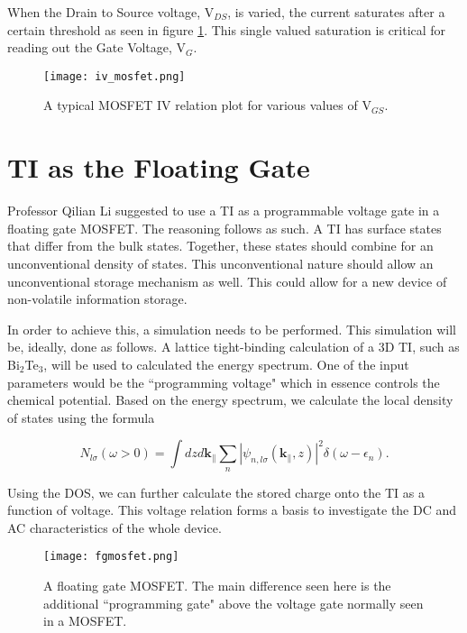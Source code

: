 \documentclass[11pt,revtex,aps]{report}
\begin{document}
When the Drain to Source voltage, V$_{DS}$, is varied, the current saturates after a certain threshold as seen in figure \ref{ivmosfet}. This single valued saturation is critical for reading out the Gate Voltage, V$_G$. 

\begin{figure}[h]
\center
\texttt{[image: iv\_mosfet.png]}
\caption{A typical MOSFET IV relation plot for various values of V$_{GS}$.
}\label{ivmosfet}
\end{figure}

\clearpage
\section{TI as the Floating Gate}
Professor Qilian Li suggested to use a TI as a programmable voltage gate in a floating gate MOSFET. The reasoning follows as such. A TI has surface states that differ from the bulk states. Together, these states should combine for an unconventional density of states. This unconventional nature should allow an unconventional storage mechanism as well. This could allow for a new device of non-volatile information storage. 

In order to achieve this, a simulation needs to be performed. This simulation will be, ideally, done as follows. A lattice tight-binding calculation of a 3D TI, such as Bi$_2$Te$_3$, will be used to calculated the energy spectrum. One of the input parameters would be the ``programming voltage" which in essence controls the chemical potential. Based on the energy spectrum, we calculate the local density of states using the formula

\begin{equation}
N_{l\sigma}(\omega>0)=\int dz d\mathbf{k}_\parallel\sum_n|\psi_{n,l\sigma}(\mathbf{k}_\parallel,z)|^2\delta(\omega-\epsilon_n). 
\end{equation}

Using the DOS, we can further calculate the stored charge onto the TI as a function of voltage. This voltage relation forms a basis to investigate the DC and AC characteristics of the whole device.

\begin{figure}[h]
\center
\texttt{[image: fgmosfet.png]}
\caption{A floating gate MOSFET. The main difference seen here is the additional ``programming gate" above the voltage gate normally seen in a MOSFET.
}\label{fgmosfet}
\end{figure}

\clearpage
\end{document}
